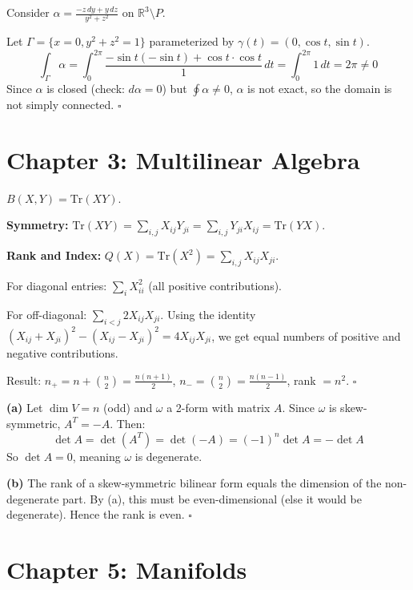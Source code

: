 \documentclass[11pt, letterpaper, openany]{book}
\newenvironment{solution}[1][Solution]{%
  \tcolorbox[blanker, breakable, left=1em,
    before skip=1em, after skip=1em,
    borderline west={2pt}{0pt}{MagicBlue},
    colback=MagicCream,
    before upper={\textcolor{MagicBlue}{\sffamily\bfseries #1.}\space}
  ]%
}{%
  \hfill\textcolor{MagicBlue}{\ensuremath{\square}}\endtcolorbox%
}
\begin{document}
\begin{solution}[2.5]
Consider $\alpha = \frac{-z\,dy + y\,dz}{y^2 + z^2}$ on $\mathbb{R}^3 \setminus P$.

Let $\Gamma = \{x = 0, y^2 + z^2 = 1\}$ parameterized by $\gamma(t) = (0, \cos t, \sin t)$.
\[
\int_\Gamma \alpha = \int_0^{2\pi} \frac{-\sin t(-\sin t) + \cos t \cdot \cos t}{1}\,dt = \int_0^{2\pi} 1\,dt = 2\pi \neq 0
\]
Since $\alpha$ is closed (check: $d\alpha = 0$) but $\oint \alpha \neq 0$, $\alpha$ is not exact, so the domain is not simply connected.
\end{solution}

\section*{Chapter 3: Multilinear Algebra}

\begin{solution}[3.1]
$B(X, Y) = \text{Tr}(XY)$.

\textbf{Symmetry:} $\text{Tr}(XY) = \sum_{i,j} X_{ij}Y_{ji} = \sum_{i,j} Y_{ji}X_{ij} = \text{Tr}(YX)$.

\textbf{Rank and Index:} $Q(X) = \text{Tr}(X^2) = \sum_{i,j} X_{ij}X_{ji}$.

For diagonal entries: $\sum_i X_{ii}^2$ (all positive contributions).

For off-diagonal: $\sum_{i<j} 2X_{ij}X_{ji}$. Using the identity $(X_{ij} + X_{ji})^2 - (X_{ij} - X_{ji})^2 = 4X_{ij}X_{ji}$, we get equal numbers of positive and negative contributions.

Result: $n_+ = n + \binom{n}{2} = \frac{n(n+1)}{2}$, $n_- = \binom{n}{2} = \frac{n(n-1)}{2}$, rank $= n^2$.
\end{solution}

\begin{solution}[3.3]
\textbf{(a)} Let $\dim V = n$ (odd) and $\omega$ a 2-form with matrix $A$. Since $\omega$ is skew-symmetric, $A^T = -A$. Then:
\[
\det A = \det(A^T) = \det(-A) = (-1)^n \det A = -\det A
\]
So $\det A = 0$, meaning $\omega$ is degenerate.

\textbf{(b)} The rank of a skew-symmetric bilinear form equals the dimension of the non-degenerate part. By (a), this must be even-dimensional (else it would be degenerate). Hence the rank is even.
\end{solution}

\section*{Chapter 5: Manifolds}
\end{document}
